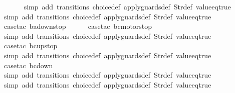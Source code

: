 \begin{isabellebody}
\ \ \ \ \ \isamarkupfalse%
\ {\isacharparenleft}simp\ add{\isacharcolon}\ transitions\ choice{\isacharunderscore}def\ apply{\isacharunderscore}guards{\isacharunderscore}def\ Str{\isacharunderscore}def\ value{\isacharunderscore}eq{\isacharunderscore}true{\isacharparenright}\isanewline
\ \ \isamarkupfalse%
\ {\isacharparenleft}simp\ add{\isacharcolon}\ transitions\ choice{\isacharunderscore}def\ apply{\isacharunderscore}guards{\isacharunderscore}def\ Str{\isacharunderscore}def\ value{\isacharunderscore}eq{\isacharunderscore}true{\isacharparenright}\isanewline
\ \isamarkupfalse%
\ {\isacharparenleft}case{\isacharunderscore}tac\ {\isachardoublequoteopen}ba{\isacharequal}down{}{}stop{\isachardoublequoteclose}{\isacharparenright}\isanewline
\ \ \ \ \isamarkupfalse%
\ {\isacharparenleft}case{\isacharunderscore}tac\ {\isachardoublequoteopen}bc{\isacharequal}motorstop{}{\isachardoublequoteclose}{\isacharparenright}\isanewline
\ \ \ \ \ \isamarkupfalse%
\ {\isacharparenleft}simp\ add{\isacharcolon}\ transitions\ choice{\isacharunderscore}def\ apply{\isacharunderscore}guards{\isacharunderscore}def\ Str{\isacharunderscore}def\ value{\isacharunderscore}eq{\isacharunderscore}true{\isacharparenright}\isanewline
\ \ \ \ \isamarkupfalse%
\ {\isacharparenleft}case{\isacharunderscore}tac\ {\isachardoublequoteopen}bc{\isacharequal}up{}{}stop{\isachardoublequoteclose}{\isacharparenright}\isanewline
\ \ \ \ \ \isamarkupfalse%
\ {\isacharparenleft}simp\ add{\isacharcolon}\ transitions\ choice{\isacharunderscore}def\ apply{\isacharunderscore}guards{\isacharunderscore}def\ Str{\isacharunderscore}def\ value{\isacharunderscore}eq{\isacharunderscore}true{\isacharparenright}\isanewline
\ \ \ \ \isamarkupfalse%
\ {\isacharparenleft}case{\isacharunderscore}tac\ {\isachardoublequoteopen}bc{\isacharequal}down{}{}{\isachardoublequoteclose}{\isacharparenright}\isanewline
\ \ \ \ \ \isamarkupfalse%
\ {\isacharparenleft}simp\ add{\isacharcolon}\ transitions\ choice{\isacharunderscore}def\ apply{\isacharunderscore}guards{\isacharunderscore}def\ Str{\isacharunderscore}def\ value{\isacharunderscore}eq{\isacharunderscore}true{\isacharparenright}\isanewline
\ \ \ \ \isamarkupfalse%
\ {\isacharparenleft}simp\ add{\isacharcolon}\ transitions\ choice{\isacharunderscore}def\ apply{\isacharunderscore}guards{\isacharunderscore}def\ Str{\isacharunderscore}def\ value{\isacharunderscore}eq{\isacharunderscore}true{\isacharparenright}\isanewline

\end{isabellebody}
